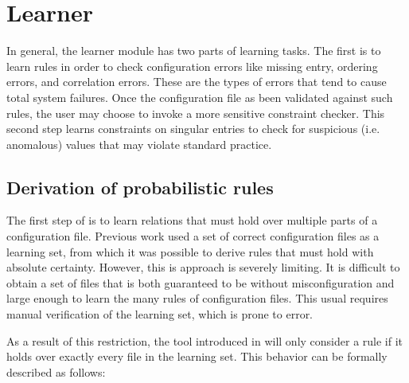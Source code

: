 
\section{Learner}
\label{sec-learn}


In general, the learner module has two parts of learning tasks.
The first is to learn rules in order to check configuration errors like
missing entry, ordering errors, and correlation errors. These are the types of errors that tend to cause total system failures.
Once the configuration file as been validated against such rules, the user may choose to invoke a more sensitive constraint checker. This second step learns constraints on singular entries to check for suspicious (i.e. anomalous) values that may violate standard practice.

\subsection{Derivation of probabilistic rules}
\label{subsec-rules}

The first step of \app is to learn relations that must hold over multiple parts of a configuration file.
Previous work used a set of correct configuration files as a learning set, from which it was possible to derive rules that must hold with absolute certainty\cite{santolucitoCAV}. 
However, this is approach is severely limiting. 
It is difficult to obtain a set of files that is both guaranteed to be without misconfiguration and large enough to learn the many rules of configuration files.
This usual requires manual verification of the learning set, which is prone to error.

As a result of this restriction, the tool introduced in \cite{santolucitoCAV} will only consider a rule if it holds over exactly every file in the learning set. This behavior can be formally described as follows:

